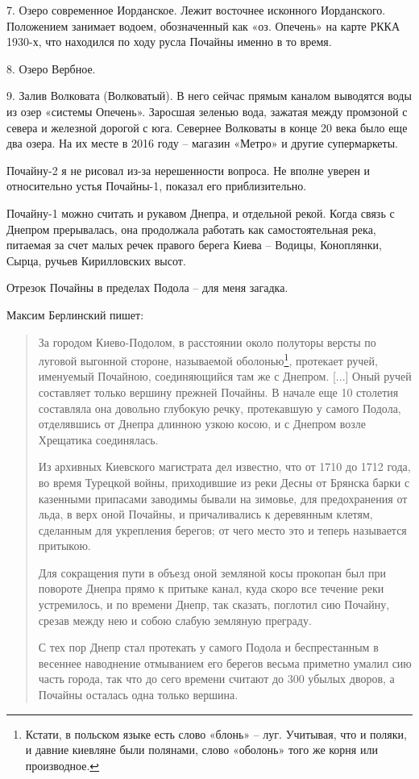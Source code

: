 7. Озеро современное Иорданское. Лежит восточнее исконного Иорданского. Положением занимает водоем, обозначенный как «оз. Опечень» на карте РККА 1930-х, что находился по ходу русла Почайны именно в то время.

8. Озеро Вербное.

9. Залив Волковата (Волковатый). В него сейчас прямым каналом выводятся воды из озер «системы Опечень». Заросшая зеленью вода, зажатая между промзоной с севера и железной дорогой с юга. Севернее Волковаты в конце 20 века было еще два озера. На их месте в 2016 году – магазин «Метро» и другие супермаркеты.

Почайну-2 я не рисовал из-за нерешенности вопроса. Не вполне уверен и относительно устья Почайны-1, показал его приблизительно.

Почайну-1 можно считать и рукавом Днепра, и отдельной рекой. Когда связь с Днепром прерывалась, она продолжала работать как самостоятельная река, питаемая за счет малых речек правого берега Киева – Водицы, Коноплянки, Сырца, ручьев Кирилловских высот.

Отрезок Почайны в пределах Подола – для меня загадка. 

Максим Берлинский пишет\cite{berl01}:

\begin{quotation}
За городом Киево-Подолом, в расстоянии около полуторы версты по луговой выгонной стороне, называемой оболонью\footnote{Кстати, в польском языке есть слово «блонь» –  луг. Учитывая, что и поляки, и давние киевляне были полянами, слово «оболонь» того же корня или производное.}, протекает ручей, именуемый Почайною, соединяющийся там же с Днепром. [...] Оный ручей составляет только вершину прежней Почайны. В начале еще 10 столетия составляла  она довольно глубокую речку, протекавшую у самого Подола, отделявшись от Днепра длинною узкою косою, и с Днепром возле Хрещатика соединялась. 

Из архивных Киевского магистрата дел известно, что от 1710 до 1712 года, во время Турецкой войны, приходившие из реки Десны от Брянска барки с казенными припасами заводимы бывали на зимовье, для предохранения от льда, в верх оной Почайны, и причаливались к деревянным клетям, сделанным для укрепления берегов; от чего место это и теперь называется притыкою.

Для сокращения пути в объезд оной земляной косы прокопан был при повороте Днепра прямо к притыке канал, куда скоро все течение реки устремилось, и по времени Днепр, так сказать, поглотил сию Почайну, срезав между нею и собою слабую земляную преграду. 

С тех пор Днепр стал протекать у самого Подола и беспрестанным в весеннее наводнение отмыванием его берегов весьма приметно умалил сию часть города, так что до сего времени считают до 300 убылых дворов, а Почайны осталась одна только вершина.
\end{quotation}

